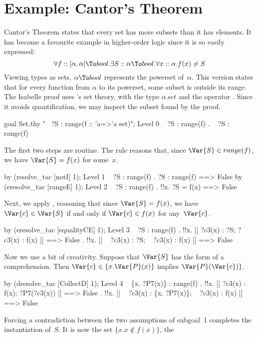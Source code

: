 \section{Example: Cantor's Theorem}
Cantor's Theorem states that every set has more subsets than it has
elements.  It has become a favourite example in higher-order logic since
it is so easily expressed:
\[  \forall f::[\alpha,\alpha]\To bool. \exists S::\alpha\To bool.
    \forall x::\alpha. f(x) \not= S 
\] 
Viewing types as sets, $\alpha\To bool$ represents the powerset
of~$\alpha$.  This version states that for every function from $\alpha$ to
its powerset, some subset is outside its range.
The Isabelle proof uses {\HOL}'s set theory, with the type $\alpha\,set$ and
the operator .  Since it avoids quantification, we may
inspect the subset found by the proof.
\begin{ttbox}
goal Set.thy "~ ?S : range(f :: 'a=>'a set)";
{\out Level 0}
{\out ~ ?S : range(f)}
{. ~ ?S : range(f)}
\end{ttbox}
The first two steps are routine.  The rule  reasons that,
since $\Var{S}\in range(f)$, we have $\Var{S}=f(x)$ for some~$x$.
\begin{ttbox}
by (resolve_tac [notI] 1);
{\out Level 1}
{\out ~ ?S : range(f)}
{. ?S : range(f) ==> False}
\ttbreak
by (eresolve_tac [rangeE] 1);
{\out Level 2}
{\out ~ ?S : range(f)}
{. !!x. ?S = f(x) ==> False}
\end{ttbox}
Next, we apply , reasoning that since $\Var{S}=f(x)$,
we have $\Var{c}\in \Var{S}$ if and only if $\Var{c}\in f(x)$ for
any~$\Var{c}$.
\begin{ttbox}
by (eresolve_tac [equalityCE] 1);
{\out Level 3}
{\out ~ ?S : range(f)}
{. !!x. [| ?c3(x) : ?S; ?c3(x) : f(x) |] ==> False}
{. !!x. [| ~ ?c3(x) : ?S; ~ ?c3(x) : f(x) |] ==> False}
\end{ttbox}
Now we use a bit of creativity.  Suppose that $\Var{S}$ has the form of a
comprehension.  Then $\Var{c}\in\{x.\Var{P}(x)\}$ implies
$\Var{P}(\Var{c})\}$.
\begin{ttbox}
by (dresolve_tac [CollectD] 1);
{\out Level 4}
{\out ~ \{x. ?P7(x)\} : range(f)}
{. !!x. [| ?c3(x) : f(x); ?P7(?c3(x)) |] ==> False}
{. !!x. [| ~ ?c3(x) : \{x. ?P7(x)\}; ~ ?c3(x) : f(x) |] ==> False}
\end{ttbox}
Forcing a contradiction between the two assumptions of subgoal~1 completes
the instantiation of~$S$.  It is now the set $\{x. x\not\in f(x)\}$, the
